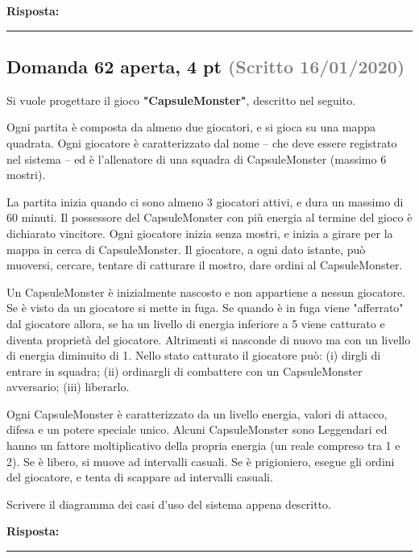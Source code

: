 \documentclass[a4paper,11pt]{article}
\begin{document}
\vspace{0.2cm}
\noindent\textbf{Risposta:}\par
\vspace{4cm}\hrule


\subsection*{Domanda 62 \hfill {\small aperta, 4 pt \textcolor{gray}{(Scritto 16/01/2020)}}}
\begin{tcolorbox}[colback=gray!8,colframe=gray!50,title=Contesto]
Si vuole progettare il gioco \textbf{"CapsuleMonster"}, descritto nel seguito.

Ogni partita è composta da almeno due giocatori, e si gioca su una mappa quadrata. Ogni giocatore è caratterizzato dal nome – che deve essere registrato nel sistema – ed è l'allenatore di una squadra di CapsuleMonster (massimo 6 mostri).

La partita inizia quando ci sono almeno 3 giocatori attivi, e dura un massimo di 60 minuti. Il possessore del CapsuleMonster con più energia al termine del gioco è dichiarato vincitore. Ogni giocatore inizia senza mostri, e inizia a girare per la mappa in cerca di CapsuleMonster. Il giocatore, a ogni dato istante, può muoversi, cercare, tentare di catturare il mostro, dare ordini al CapsuleMonster.

Un CapsuleMonster è inizialmente nascosto e non appartiene a nessun giocatore. Se è visto da un giocatore si mette in fuga. Se quando è in fuga viene "afferrato" dal giocatore allora, se ha un livello di energia inferiore a 5 viene catturato e diventa proprietà del giocatore. Altrimenti si nasconde di nuovo ma con un livello di energia diminuito di 1. Nello stato catturato il giocatore può: (i) dirgli di entrare in squadra; (ii) ordinargli di combattere con un CapsuleMonster avversario; (iii) liberarlo.

Ogni CapsuleMonster è caratterizzato da un livello energia, valori di attacco, difesa e un potere speciale unico. Alcuni CapsuleMonster sono Leggendari ed hanno un fattore moltiplicativo della propria energia (un reale compreso tra 1 e 2). Se è libero, si muove ad intervalli casuali. Se è prigioniero, esegue gli ordini del giocatore, e tenta di scappare ad intervalli casuali.
\end{tcolorbox}
Scrivere il diagramma dei casi d'uso del sistema appena descritto.

\vspace{0.2cm}
\noindent\textbf{Risposta:}\par
\vspace{4cm}\hrule
\end{document}
